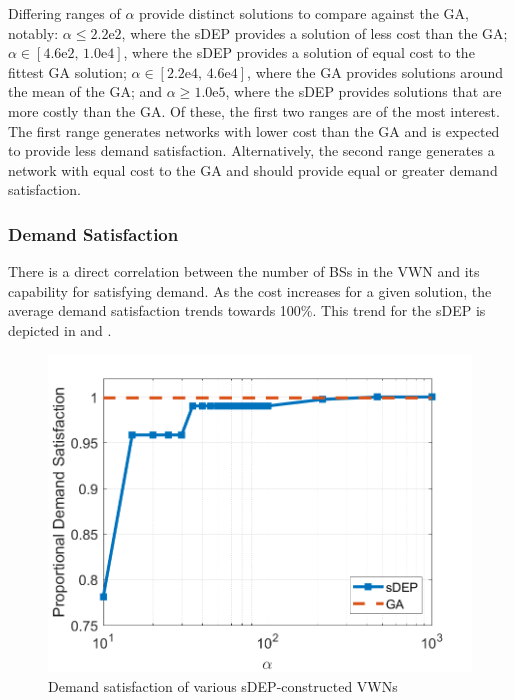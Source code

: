 \documentclass[12pt,dvipsnames]{report}
\newcommand{\expnumber}[2]{{#1}\mathrm{e}{#2}}
\begin{document}
Differing ranges of $\alpha$ provide distinct solutions to compare against the GA, notably: $\alpha \leq \expnumber{2.2}{2}$, where the sDEP provides a solution of less cost than the GA; $\alpha \in \left[ \expnumber{4.6}{2},\, \expnumber{1.0}{4} \right]$, where the sDEP provides a solution of equal cost to the fittest GA solution; $\alpha \in \left[ \expnumber{2.2}{4},\, \expnumber{4.6}{4} \right]$, where the GA provides solutions around the mean of the GA; and $\alpha \geq \expnumber{1.0}{5}$, where the sDEP provides solutions that are more costly than the GA.  Of these, the first two ranges are of the most interest.  The first range generates networks with lower cost than the GA and is expected to provide less demand satisfaction.  Alternatively, the second range generates a network with equal cost to the GA and should provide equal or greater demand satisfaction.

\subsubsection{Demand Satisfaction}

There is a direct correlation between the number of BSs in the VWN and its capability for satisfying demand.  As the cost increases for a given solution, the average demand satisfaction trends towards 100\%.  This trend for the sDEP is depicted in  and .

\begin{figure}[htp]
	\centering
	\includegraphics[height=0.4\textheight]{Figures/Prelim_O25_VOSDemandSatisfaction}
	\caption[Preliminary simulations sDEP demand satisfaction]{Demand satisfaction of various sDEP-constructed VWNs}
	\label{fig:Prelim_VOSDemandSatisfaction}
\end{figure}
\end{document}
